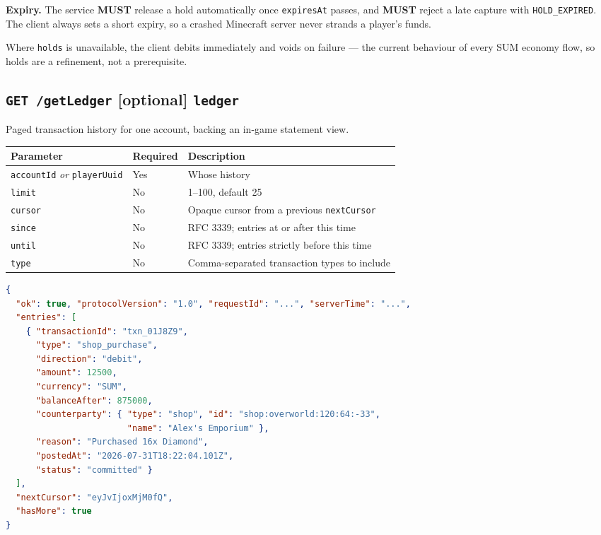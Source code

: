 \documentclass[11pt,a4paper]{article}
\newcommand{\code}[1]{\texttt{\small #1}}
\newcommand{\req}{\textbf{MUST}}
\newcommand{\optional}{{\small\color{omceMuted}\textbf{[optional]}}}
\newcommand{\keybox}[2]{%
  \par\vspace{0.5em}\noindent
  \colorbox{#1}{%
    \begin{minipage}{\dimexpr\linewidth-2\fboxsep\relax}
    \vspace{0.35em}\small #2\vspace{0.35em}
    \end{minipage}}%
  \par\vspace{0.5em}}
\newcommand{\note}[1]{\keybox{omceWash}{#1}}
\begin{document}
\note{\textbf{Expiry.} The service \req{} release a hold automatically once \code{expiresAt} passes,
and \req{} reject a late capture with \code{HOLD\_EXPIRED}. The client always sets a short expiry,
so a crashed Minecraft server never strands a player's funds.}

Where \code{holds} is unavailable, the client debits immediately and voids on failure --- the
current behaviour of every SUM economy flow, so holds are a refinement, not a prerequisite.

\subsection{\code{GET /getLedger} \optional{} \code{ledger}}

Paged transaction history for one account, backing an in-game statement view.

\begin{tabularx}{\linewidth}{L{4.6cm} L{1.7cm} X}
\toprule
\textbf{Parameter} & \textbf{Required} & \textbf{Description}\\
\midrule
\code{accountId} \emph{or} \code{playerUuid} & Yes & Whose history\\
\code{limit}  & No & 1--100, default 25\\
\code{cursor} & No & Opaque cursor from a previous \code{nextCursor}\\
\code{since}  & No & RFC 3339; entries at or after this time\\
\code{until}  & No & RFC 3339; entries strictly before this time\\
\code{type}   & No & Comma-separated transaction types to include\\
\bottomrule
\end{tabularx}

\begin{lstlisting}[language=json]
{
  "ok": true, "protocolVersion": "1.0", "requestId": "...", "serverTime": "...",
  "entries": [
    { "transactionId": "txn_01J8Z9",
      "type": "shop_purchase",
      "direction": "debit",
      "amount": 12500,
      "currency": "SUM",
      "balanceAfter": 875000,
      "counterparty": { "type": "shop", "id": "shop:overworld:120:64:-33",
                        "name": "Alex's Emporium" },
      "reason": "Purchased 16x Diamond",
      "postedAt": "2026-07-31T18:22:04.101Z",
      "status": "committed" }
  ],
  "nextCursor": "eyJvIjoxMjM0fQ",
  "hasMore": true
}
\end{lstlisting}
\end{document}
